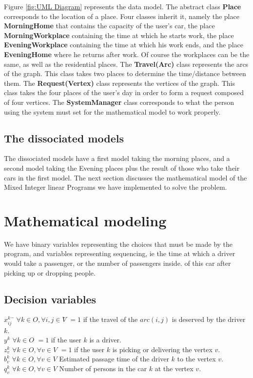 \documentclass[12pt, a4paper,twoside]{memoir}
\newcommand{\newpar}{\vskip 0.2in \noindent}
\newcommand\tab[1][1cm]{\hspace*{#1}}
\begin{document}
	\noindent Figure \ref{fig:UML Diagram} represents the data model. \newline
	The abstract class \textbf{Place} corresponds to the location of a place. Four classes inherit it, namely the place \textbf{MorningHome} that contains the capacity of the user's car, the place \textbf{MorningWorkplace} containing the time at which he starts work, the place \textbf{EveningWorkplace} containing the time at which his work ends, and the place \textbf{EveningHome} where he returns after work. Of course the workplaces can be the same, as well as the residential places. The \textbf{Travel(Arc)} class represents the arcs of the graph. This class takes two places to determine the time/distance between them. The \textbf{Request(Vertex)} class represents the vertices of the graph. This class takes the four places of the user's day in order to form a request composed of four vertices. The \textbf{SystemManager} class corresponds to what the person using the system must set for the mathematical model to work properly.
	
	\subsection{The dissociated models}
	
	The dissociated models have a first model taking the morning places, and a second model taking the Evening places plus the result of those who take their cars in the first model.
	\newpar
	The next section discusses the mathematical model of the Mixed Integer linear Programs we have implemented to solve the problem.
	
	\section{Mathematical modeling}
	
	We have binary variables representing the choices that must be made by the program, and variables representing sequencing, ie the time at which a driver would take a passenger, or the number of passengers inside. of this car after picking up or dropping people.
	
	\subsection{Decision variables}
	\begin{tabbing}
		$x^{k}_{ij}$ \tab \= $\forall k\in O,\forall i,j\in V$\tab \= $=1$ if the travel of the $arc(i,j)$ is deserved by the driver $k$. \\
		$y^{k}$ \> $\forall k\in O$ \> $=1$ if the user $k$ is a driver. \\
		$z^{k}_{v}$ \> $\forall k\in O,\forall v\in V$ \> $=1$ if the user $k$ is picking or delivering the vertex $v$. \\
		$b^{k}_{v}$ \> $\forall k\in O,\forall v\in V$ \> Estimated passage time of the driver $k$ to the vertex $v$. \\
		$q^{k}_{v}$ \> $\forall k\in O,\forall v\in V$ \> Number of persons in the car $k$ at the vertex $v$. \\
	\end{tabbing}
	
\end{document}
